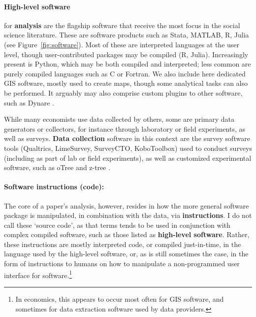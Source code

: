 \documentclass{Revue-economique}
\newcommand{\citep}{\parencite}
\begin{document}
\begin{Article} [%
	Titre={Reproducibility and Open Science in Economics},
	Auteur={Lars Vilhuber\thanks{Cornell University, lars.vilhuber@cornell.edu}}]
\begin{refsection}[Main]
\paragraph{High-level software} for \textbf{analysis} are the flagship software  that receive the most  focus in the social science literature. These are software products such as Stata, MATLAB, R, Julia (see Figure~\ref{fig:software}). Most of these are interpreted languages at the user level, though user-contributed packages may be compiled (R, Julia). Increasingly present is Python, which may be both compiled and interpreted; less common are purely compiled languages such as C or Fortran. We also include here dedicated \ac{GIS} software, mostly used to create maps, though some analytical tasks can also be performed. It arguably may also comprise custom plugins to other software, such as Dynare \citep{adjemian_dynare_2024,cherrier_write_2023}.



While many economists use data collected by others, some are primary data generators or collectors, for instance through laboratory or field experiments, as well as surveys. \textbf{Data collection} software in this context are the survey software tools (Qualtrics, LimeSurvey, SurveyCTO, KoboToolbox) used to conduct surveys (including as part of lab or field experiments), as well as customized experimental software, such as oTree \citep{chen_otreeopen-source_2016} and z-tree \citep{fischbacher_z-tree_2021}.

\paragraph{Software instructions (code):} The core of a paper's analysis, however, resides in how the more general software package is manipulated, in combination with the data, via \textbf{instructions}. I do not call these `source code', as that terms tends to be used in conjunction with complex compiled software, such as those listed as \textbf{high-level software}. Rather, these instructions are mostly interpreted code, or compiled just-in-time, in the language used by the high-level software, or, as is still sometimes the case, in the form of instructions to humans on how to manipulate a non-programmed user interface for software.\footnote{In economics, this appears to occur most often for \ac{GIS} software, and sometimes for data extraction software used by data providers.}


\end{refsection}
\end{Article}
\end{document}
